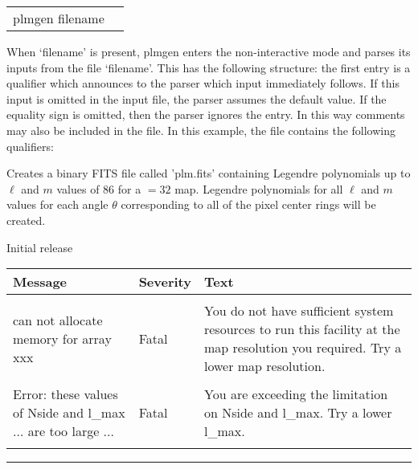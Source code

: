 \vfill\newpage

\begin{examples}{2}
{
\begin{tabular}{ll} %
plmgen  filename \\
\end{tabular}
}
{When `filename' is present, plmgen enters the non-interactive mode 
and parses
its inputs from the file `filename'. This has the following
structure: the first entry is a qualifier which announces to the parser
which input immediately follows. If this input is omitted in the
input file, the parser assumes the default value.
If the equality sign is omitted, then the parser ignores the entry.
In this way comments may also be included in the file.
In this example, the file contains the following qualifiers:\hfill\newline
{}

Creates a binary FITS file called 'plm.fits' containing Legendre polynomials 
up to $\ell$ and $m$ values of 86 for a 
$=32$ map. 
Legendre polynomials for all $\ell$ and $m$ 
values for each angle $\theta$ corresponding to all of the \healpix
pixel center rings will be 
created.}
\end{examples}

\begin{release}
  \begin{relist}
    \item Initial release 
  \end{relist}
\end{release}

\begin{messages}
{
\begin{tabular}{p{0.25\hsize} p{0.1\hsize} p{0.35\hsize}} \hline  
  \textbf{Message} & \textbf{Severity} & \textbf{Text} \\ \hline
                   &                   &   \\ %
can not allocate memory for array xxx &  Fatal & You do not have
                   sufficient system resources to run this
                   facility at the map resolution you required. 
  Try a lower map resolution.  \\ 
                   &                   &   \\ %
Error: these values of Nside and l\_max $\ldots$ are too large $\ldots$ &  Fatal & You are exceeding
the limitation on Nside and l\_max. 
  Try a lower l\_max.  \\ 
                   &                   &   \\ \hline %
\end{tabular}
} 
\end{messages}

\rule{\hsize}{2mm}

\newpage
